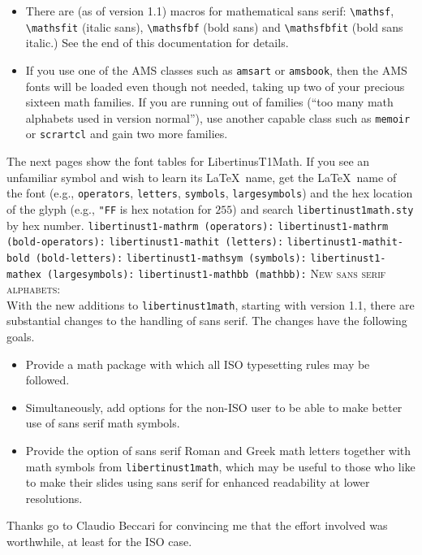 \documentclass{article}
\begin{document}
\begin{itemize}
\item There are (as of version 1.1) macros for mathematical sans serif: \verb|\mathsf|, \verb|\mathsfit| (italic sans), \verb|\mathsfbf| (bold sans) and \verb|\mathsfbfit| (bold sans italic.) See the end of this documentation for details.
\item If you use one of the AMS classes such as {\tt amsart} or {\tt amsbook}, then the AMS fonts will be loaded even though not needed, taking up two of your precious sixteen math families. If you are running out of families (``too many math alphabets used in version normal''), use another capable class such as {\tt memoir} or {\tt scrartcl} and gain two more families.
\end{itemize}
The next pages show the font tables for LibertinusT1Math. If you see an unfamiliar symbol and wish to learn its \LaTeX\ name, get the \LaTeX\ name of the font (e.g., {\tt operators}, {\tt letters}, {\tt symbols}, {\tt largesymbols}) and the hex location of the glyph (e.g., \verb|"FF| is hex notation for $255$) and search {\tt libertinust1math.sty} by hex number.
\newpage
{\tt libertinust1-mathrm (operators):}
\newpage
{\tt libertinust1-mathrm (bold-operators):}
\newpage
{\tt libertinust1-mathit (letters):}
\newpage
{\tt libertinust1-mathit-bold (bold-letters):}
\newpage
{\tt libertinust1-mathsym (symbols):}
\newpage
{\tt libertinust1-mathex (largesymbols):}
\newpage
{\tt libertinust1-mathbb (mathbb):}
\newpage
\textsc{New sans serif alphabets:}\\
With the new additions to {\tt libertinust1math}, starting with version 1.1, there are substantial changes to the handling of sans serif.  The changes have the following goals.
\begin{itemize}
\item
Provide a math package with which all ISO typesetting rules may be followed.
\item Simultaneously, add options for the non-ISO user to be able to make better use of sans serif math symbols.
\item Provide the option of sans serif Roman and Greek math letters together with math symbols from {\tt libertinust1math}, which may be useful to those who like to make their slides using sans serif for enhanced readability at lower resolutions.
\end{itemize}
Thanks go to Claudio Beccari for convincing me that the effort involved was worthwhile, at least for the ISO case.
\end{document}
